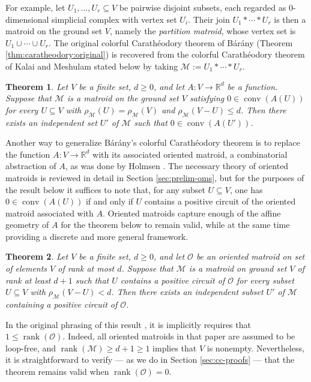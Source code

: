 \documentclass[a4paper,11pt,reqno, english]{amsart}
\newtheorem{theorem}{Theorem}[section]
\theoremstyle{definition}
\theoremstyle{remark}
\newcommand\R{\mathbb R}
\DeclareMathOperator{\conv}{\mathrm{conv}}
\begin{document}
\medskip
For example, let $U_1,\ldots,U_r\subseteq V$ be pairwise disjoint subsets, each regarded as $0$-dimensional simplicial complex with vertex set $U_i$. 
Their join $U_1*\cdots*U_r$ is then a matroid on the ground set $V$, namely the \emph{partition matroid}, whose vertex set is $U_1\cup\cdots\cup U_r$. 
The original colorful Carath\'eodory theorem of B\'ar\'any (Theorem \ref{thm:caratheodory:original}) is recovered from the colorful Carath\'eodory theorem of Kalai and Meshulam stated below by taking $\mathscr{M}:=U_1*\cdots *U_r$.


\begin{theorem}\label{thm:caratheodory:matroid}
Let $V$ be a finite set, $d\geq 0$, and let $A\colon V\to\R^d$ be a function. 
Suppose that $\mathscr{M}$ is a matroid on the ground set $V$ satisfying $0\in\conv(A(U))$ for every $U\subseteq V$ with $\rho_\mathscr{M}(U)=\rho_\mathscr{M}(V)$ and $\rho_\mathscr{M}(V-U)\leq d$. 
Then there exists an independent set $U'$ of $\mathscr{M}$ such that $0\in\conv(A(U'))$.
\end{theorem}

Another way to generalize B\'ar\'any’s colorful Carath\'eodory theorem is to replace the function $A\colon V\to\R^d$ with its associated oriented matroid, a combinatorial abstraction of $A$, as was done by Holmsen \cite[Thm.\,1.2]{Holmsen2016}. 
The necessary theory of oriented matroids is reviewed in detail in Section \ref{sec:prelim-oms}, but for the purposes of the result below it suffices to note that, for any subset $U\subseteq V$, one has $0\in\conv(A(U))$ if and only if $U$ contains a positive circuit of the oriented matroid associated with $A$. 
Oriented matroids capture enough of the affine geometry of $A$ for the theorem below to remain valid, while at the same time providing a discrete and more general framework.

\begin{theorem}\label{thm:caratheodory:oriented-matroid}
Let $V$ be a finite set, $d\geq 0$, and let $\mathscr{O}$ be an oriented matroid on set of elements $V$ of rank at most $d$. 
Suppose that $\mathscr{M}$ is a matroid on ground set $V$ of rank at least $d+1$ such that $U$ contains a positive circuit of $\mathscr{O}$ for every subset $U\subseteq V$ with $\rho_\mathscr{M}(V-U)<d$.
Then there exists an independent subset $U'$ of $\mathscr{M}$ containing a positive circuit of $\mathscr{O}$.
\end{theorem}

In the original phrasing of this result \cite[Thm.\,1.2]{Holmsen2016}, it is implicitly requires that $1 \leq \operatorname{rank}(\mathscr{O})$.
Indeed, all oriented matroids in that paper are assumed to be loop-free, and $\operatorname{rank}(\mathscr{M}) \geq d+1 \geq 1$ implies that $V$ is nonempty. 
Nevertheless, it is straightforward to verify --- as we do in Section \ref{sec:cc-proofs} --- that the theorem remains valid when $\operatorname{rank}(\mathscr{O}) = 0$.
\end{document}
